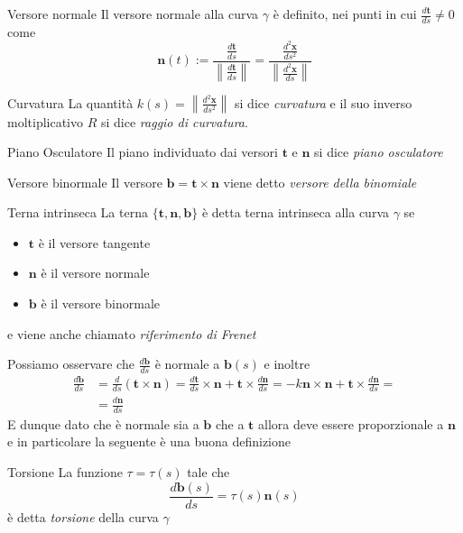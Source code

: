 \begin{definition}{Versore normale}
    Il versore normale alla curva \(\gamma\) è definito, nei punti in cui
    \(\frac{d\mathbf{t} }{ds} \neq 0\) come 
    \[
        \mathbf{n} {(t)} := \frac{\frac{d\mathbf{t} }{ds}}{\left\|\frac{d\mathbf{t}
        }{ds}\right\|} = \frac{\frac{d^2 \mathbf{x} }{ds^2}}{\left\|\frac{d^2 \mathbf{x}
    }{ds}\right\|}
    \]

\end{definition}
\begin{definition}{Curvatura}
    La quantità \(k{(s)} = \left\|\frac{d^2 \mathbf{x} }{ds^2}\right\|\) si dice
    \emph{curvatura} e il suo inverso moltiplicativo \(R\) si dice \emph{raggio di
    curvatura}. 
\end{definition}
\begin{definition}{Piano Osculatore}
    Il piano individuato dai versori \(\mathbf{t} \) e \(\mathbf{n} \) si dice
    \emph{piano osculatore}
\end{definition}
\begin{definition}{Versore binormale}
    Il versore \(\mathbf{b} = \mathbf{t}  \times  \mathbf{n} \) viene detto
    \emph{versore della binomiale}
\end{definition}

\begin{definition}{Terna intrinseca}
    La terna \(\{\mathbf{t} , \mathbf{n} , \mathbf{b} \}\) è detta terna
    intrinseca alla curva \(\gamma\) se
    \begin{itemize}
        \item \(\mathbf{t} \) è il versore tangente
        \item \(\mathbf{n} \) è il versore normale
        \item \(\mathbf{b} \) è il versore binormale
    \end{itemize}
    e viene anche chiamato \emph{riferimento di Frenet}

\end{definition}

Possiamo osservare che \(\frac{d\mathbf{b} }{ds}\) è normale a
\(\mathbf{b}{(s)}\) e inoltre
\begin{align*}
    \frac{d\mathbf{b} }{ds} &= \frac{d}{ds}(\mathbf{t}  \times  \mathbf{n} ) =
    \frac{d\mathbf{t} }{ds} \times  \mathbf{n}  + \mathbf{t}  \times
    \frac{d\mathbf{n} }{ds} = -k \mathbf{n}  \times  \mathbf{n}  + \mathbf{t}
    \times \frac{d\mathbf{n} }{ds}=\\
    &= \frac{d\mathbf{n} }{ds}
\end{align*}
E dunque dato che è normale sia a \(\mathbf{b}\) che a \(\mathbf{t} \) allora
deve essere proporzionale a \(\mathbf{n} \) e in particolare la seguente è una
buona definizione
\begin{definition}{Torsione}
    La funzione \(\tau = \tau{(s)}\) tale che
    \[
        \frac{d\mathbf{b}{(s)} }{ds} = \tau{(s)} \mathbf{n}{(s)}
    \]
    è detta \emph{torsione} della curva \(\gamma\)
\end{definition}

